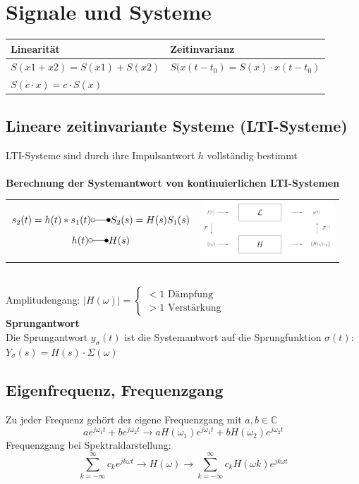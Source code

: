 \section{Signale und Systeme}
	\begin{tabular}{|l|l|}
    	\hline
    	\textbf{Linearität} & \textbf{Zeitinvarianz}\\
    	\hline
    	$S(x1+x2)=S(x1)+S(x2)$ & $S(x(t-t_0)=S(x)\cdot x(t-t_0)$ \\
    	$S(c\cdot x)=c\cdot S(x)$ & \\
		\hline    
    \end{tabular}
	
	\subsection{Lineare zeitinvariante Systeme (LTI-Systeme)}
		LTI-Systeme sind durch ihre Impulsantwort $h$ vollständig bestimmt\\ \\	
		\textbf{Berechnung der Systemantwort von kontinuierlichen LTI-Systemen}\\
		\begin{tabular}{ll}
			\parbox{8cm}{
			$$s_2(t) = h(t) * s_1(t) \laplace S_2(s) = H(s) S_1(s)$$
			$$h(t) \laplace H(s)$$}
			& \parbox{4cm}{
			\includegraphics[width=5cm]{./bilder/utf-theorie.png}}\\
		\end{tabular} \\
		Amplitudengang: 		$|H(\omega)| = \begin{cases}
								< 1 \text{ Dämpfung} \\
								> 1 \text{ Verstärkung}
								\end{cases}$	\\
		\textbf{Sprungantwort} \\
		Die Sprungantwort $y_{\sigma}(t)$ ist die Systemantwort auf die
		Sprungfunktion $\sigma(t)$: \\ $Y_{\sigma}(s)=H(s) \cdot \Sigma(\omega)$

	\subsection{Eigenfrequenz, Frequenzgang}
	Zu jeder Frequenz gehört der eigene Frequenzgang mit $a, b \in \mathbb{C}$\\
	$$a e^{j\omega_1 t} + b e^{j\omega_2 t} \rightarrow a H(\omega_1) e^{j\omega_1 t} + b H(\omega_2) e^{j\omega_2 t}$$
	Frequenzgang bei Spektraldarstellung: $$\sum_{k=-\infty}^{\infty} c_k e^{jk\omega t} \rightarrow \boxed{H(\omega)}
	\rightarrow \sum_{k=-\infty}^{\infty} c_k H(\omega k) e^{jk\omega t}$$			
		
